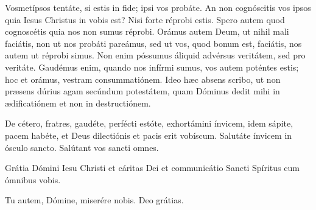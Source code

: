 {\noindent Vosmetípsos tentáte, si estis in fide; ipsi vos probáte. An non cognóscitis vos ipsos quia Iesus Christus in vobis est? Nisi forte réprobi estis. Spero autem quod cognoscétis quia nos non sumus réprobi. Orámus autem Deum, ut nihil mali faciátis, non ut nos probáti pareámus, sed ut vos, quod bonum est, faciátis, nos autem ut réprobi simus. Non enim póssumus áliquid advérsus veritátem, sed pro veritáte. Gaudémus enim, quando nos infírmi sumus, vos autem poténtes estis; hoc et orámus, vestram consummatiónem. Ideo hæc absens scribo, ut non præsens dúrius agam secúndum potestátem, quam Dóminus dedit mihi in ædificatiónem et non in destructiónem.

\noindent De cétero, fratres, gaudéte, perfécti estóte, exhortámini ínvicem, idem sápite, pacem habéte, et Deus dilectiónis et pacis erit vobíscum. Salutáte ínvicem in ósculo sancto. Salútant vos sancti omnes.

\noindent Grátia Dómini Iesu Christi et cáritas Dei et communicátio Sancti Spíritus cum ómnibus vobis.

\noindent \Vbardot{} Tu autem, Dómine, miserére nobis.
\noindent \Rbardot{} Deo grátias.}
\newcommand{\responsoriumi}{\pars{Responsorium 1.} \scriptura{\Rbardot{} Ps. 32, 1 \Vbardot{} ibid., 2; \textbf{H252} \& \textbf{E234}}

\vspace{-5mm}

\responsorium{I}{temporalia/resp-gaudeteiusti-CROCHU.gtex}{}}

